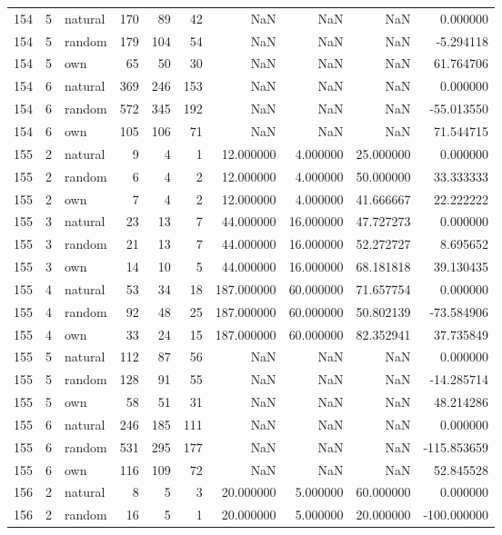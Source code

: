 \begin{table}[htbp]
\begin{tabular}{rrlrrrrrrr}
154 & 5 & natural & 170 & 89 & 42 & NaN & NaN & NaN & 0.000000 \\
154 & 5 & random & 179 & 104 & 54 & NaN & NaN & NaN & -5.294118 \\
154 & 5 & own & 65 & 50 & 30 & NaN & NaN & NaN & 61.764706 \\
154 & 6 & natural & 369 & 246 & 153 & NaN & NaN & NaN & 0.000000 \\
154 & 6 & random & 572 & 345 & 192 & NaN & NaN & NaN & -55.013550 \\
154 & 6 & own & 105 & 106 & 71 & NaN & NaN & NaN & 71.544715 \\
155 & 2 & natural & 9 & 4 & 1 & 12.000000 & 4.000000 & 25.000000 & 0.000000 \\
155 & 2 & random & 6 & 4 & 2 & 12.000000 & 4.000000 & 50.000000 & 33.333333 \\
155 & 2 & own & 7 & 4 & 2 & 12.000000 & 4.000000 & 41.666667 & 22.222222 \\
155 & 3 & natural & 23 & 13 & 7 & 44.000000 & 16.000000 & 47.727273 & 0.000000 \\
155 & 3 & random & 21 & 13 & 7 & 44.000000 & 16.000000 & 52.272727 & 8.695652 \\
155 & 3 & own & 14 & 10 & 5 & 44.000000 & 16.000000 & 68.181818 & 39.130435 \\
155 & 4 & natural & 53 & 34 & 18 & 187.000000 & 60.000000 & 71.657754 & 0.000000 \\
155 & 4 & random & 92 & 48 & 25 & 187.000000 & 60.000000 & 50.802139 & -73.584906 \\
155 & 4 & own & 33 & 24 & 15 & 187.000000 & 60.000000 & 82.352941 & 37.735849 \\
155 & 5 & natural & 112 & 87 & 56 & NaN & NaN & NaN & 0.000000 \\
155 & 5 & random & 128 & 91 & 55 & NaN & NaN & NaN & -14.285714 \\
155 & 5 & own & 58 & 51 & 31 & NaN & NaN & NaN & 48.214286 \\
155 & 6 & natural & 246 & 185 & 111 & NaN & NaN & NaN & 0.000000 \\
155 & 6 & random & 531 & 295 & 177 & NaN & NaN & NaN & -115.853659 \\
155 & 6 & own & 116 & 109 & 72 & NaN & NaN & NaN & 52.845528 \\
156 & 2 & natural & 8 & 5 & 3 & 20.000000 & 5.000000 & 60.000000 & 0.000000 \\
156 & 2 & random & 16 & 5 & 1 & 20.000000 & 5.000000 & 20.000000 & -100.000000 \\

\end{tabular}
\end{table}

